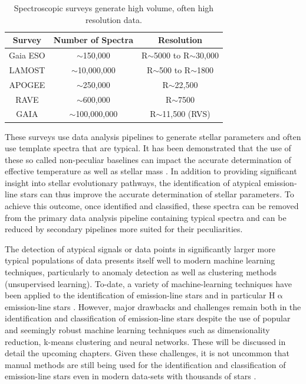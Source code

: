 \begin{table}[!htb]
\begin{center}
\begin{tabular}{|c|c|c|}
\hline
\textbf{Survey} & \textbf{Number of Spectra} & \textbf{Resolution} \\ \hline
Gaia ESO        & $\sim$150,000              & R$\sim$5000 to R$\sim$30,000             \\ \hline
LAMOST          & $\sim$10,000,000           & R$\sim$500 to R$\sim$1800              \\ \hline
APOGEE          & $\sim$250,000              & R$\sim$22,500             \\ \hline
RAVE            & $\sim$600,000              & R$\sim$7500                 \\ \hline
GAIA            & $\sim$100,000,000          & R$\sim$11,500 (RVS)               \\ \hline
\end{tabular}
\caption{Spectroscopic surveys generate high volume, often high resolution data.}
\label{table:draglift1}
\end{center}
\end{table}
These surveys use data analysis pipelines to generate stellar parameters and often use template spectra that are typical. It has been demonstrated that the use of these so called non-peculiar baselines can impact the accurate determination of effective temperature \cite{cayrel2011halpha}\cite{amarsi2018effective}\cite{giribaldi2019accurate} as well as stellar mass \cite{ness2016spectroscopic}\cite{bergemann2016gaia}. In addition to providing significant insight into stellar evolutionary pathways, the identification of atypical emission-line stars can thus improve the accurate determination of stellar parameters. To achieve this outcome, once identified and classified, these spectra can be removed from the primary data analysis pipeline containing typical spectra and can be reduced by secondary pipelines more suited for their peculiarities. 

The detection of atypical signals or data points in significantly larger more typical populations of data presents itself well to modern machine learning techniques, particularly to anomaly detection as well as clustering methods (unsupervised learning). To-date, a variety of machine-learning techniques have been applied to the identification of emission-line stars and in particular H$\upalpha$ emission-line stars . However, major drawbacks and challenges remain both in the identification and classification of emission-line stars despite the use of popular and seemingly robust machine learning techniques such as dimensionality reduction, k-means clustering and neural networks. These will be discussed in detail the upcoming chapters. Given these challenges, it is not uncommon that manual methods are still being used for the identification and classification of emission-line stars even in modern data-sets with thousands of stars \cite{zhang2021catalog}. 

